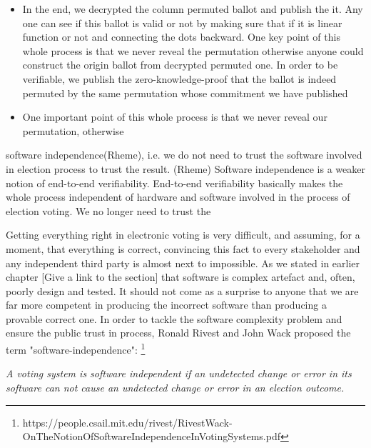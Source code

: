 \begin{itemize}
\item In the end, we decrypted the column permuted ballot and publish the 
it. Any one can see if this ballot is valid or not by making sure that 
if it is linear function or not and connecting the dots backward. One key point 
of this whole process is that we never reveal the permutation otherwise anyone 
could  construct the origin ballot from decrypted permuted one. In order to be 
verifiable, we publish the zero-knowledge-proof that the ballot is indeed permuted by 
the same permutation whose commitment we have published

\item One important point of this whole process is that we never reveal our permutation, 
otherwise 
\end{itemize}




software independence(Rheme), i.e. we do not need to trust the software involved in 
election process to trust the result. (Rheme) Software independence is a weaker notion of 
end-to-end verifiability. End-to-end verifiability basically makes the whole process 
independent of hardware and software involved in the process of election voting. We no longer 
need to trust the 




Getting everything right in electronic voting is very difficult, and assuming, for a moment,
that everything is correct, convincing this fact to every stakeholder and  any independent third party 
is almost next to impossible.  As we stated in earlier chapter [Give a link to the section] that 
software is complex artefact and, often, poorly design and tested. It should not come as a surprise to anyone
that we are far more competent in producing the incorrect software than producing a provable correct one. 
 In order to tackle the software complexity problem and ensure the 
public trust in process, Ronald Rivest and John Wack  proposed  the term "software-independence": 
\footnote{https://people.csail.mit.edu/rivest/RivestWack-OnTheNotionOfSoftwareIndependenceInVotingSystems.pdf}

\textit{A voting system is software independent if an undetected change or error
   in its software can not cause an undetected change or error in an 
   election outcome.}
 
